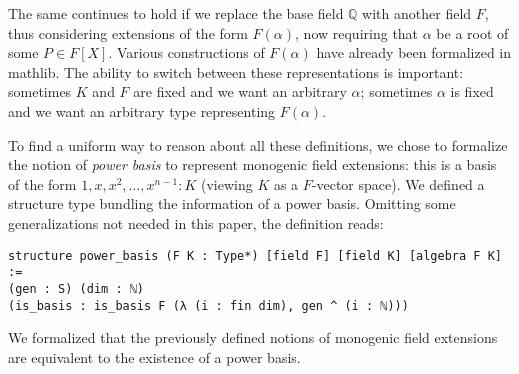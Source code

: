 \documentclass[a4paper,USenglish,cleveref, autoref, thm-restate]{lipics-v2021}
\newcommand{\mathlib}{\textsf{mathlib}\xspace}
\newcommand{\Q}{\mathbb{Q}}
\begin{document}
The same continues to hold if we replace the base field $\Q$ with another field $F$, thus considering extensions of the form $F(\alpha)$, now requiring that $\alpha$ be a root of some $P\in F[X]$. Various constructions of $F(\alpha)$ have already been formalized in \mathlib. The ability to switch between these representations is important: sometimes $K$ and $F$ are fixed and we want an arbitrary $\alpha$; sometimes $\alpha$ is fixed and we want an arbitrary type representing $F(\alpha)$.

To find a uniform way to reason about all these definitions,
we chose to formalize the notion of \emph{power basis} to represent monogenic field extensions: this is a basis of the form $1, x, x^2, \dots, x^{n-1} : K$ (viewing $K$ as a $F$-vector space).
We defined a structure type bundling the information of a power basis.
Omitting some generalizations not needed in this paper, the definition reads:
\begin{lstlisting}
structure power_basis (F K : Type*) [field F] [field K] [algebra F K] :=
(gen : S) (dim : ℕ)
(is_basis : is_basis F (λ (i : fin dim), gen ^ (i : ℕ)))
\end{lstlisting}
We formalized that the previously defined notions of monogenic field extensions are equivalent to the existence of a power basis.

\end{document}
